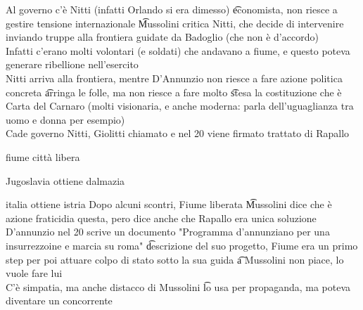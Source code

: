 \documentclass[12pt]{article}
\begin{document}
Al governo c'è Nitti (infatti Orlando si era dimesso) \t economista, non riesce a gestire tensione internazionale \t Mussolini critica Nitti, che decide di intervenire inviando truppe alla frontiera guidate da Badoglio (che non è d'accordo) \\
Infatti c'erano molti volontari (e soldati) che andavano a fiume, e questo poteva generare ribellione nell'esercito \\
Nitti arriva alla frontiera, mentre D'Annunzio non riesce a fare azione politica concreta \t arringa le folle, ma non riesce a fare molto \t stesa la costituzione che è Carta del Carnaro (molti visionaria, e anche moderna: parla dell'uguaglianza tra uomo e donna per esempio) \\
Cade governo Nitti, Giolitti chiamato e nel 20 viene firmato trattato di Rapallo
\bi
  \item fiume città libera
  \item Jugoslavia ottiene dalmazia 
  \item italia ottiene istria
\ei
Dopo alcuni scontri, Fiume liberata \t Mussolini dice che è azione fraticidia questa, pero dice anche che Rapallo era unica soluzione \\
D'annunzio nel 20 scrive un documento "Programma d'annunziano per una insurrezzoine e marcia su roma" \t descrizione del suo progetto, Fiume era un primo step per poi attuare colpo di stato sotto la sua guida \t a Mussolini non piace, lo vuole fare lui \\
C'è simpatia, ma anche distacco di Mussolini \t lo usa per propaganda, ma poteva diventare un concorrente
\end{document}
